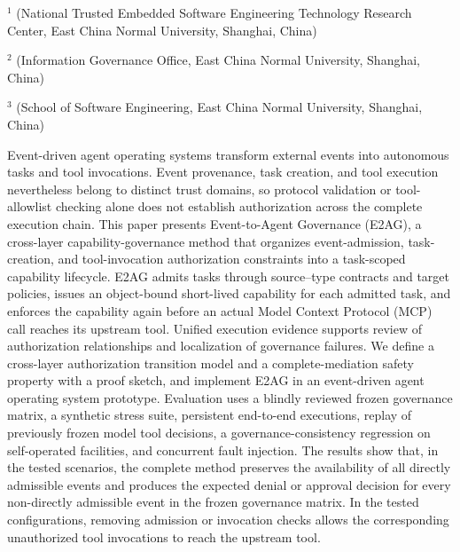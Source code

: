 \vspace{8pt}
\vspace{4pt}
\vspace{3pt}
\begingroup\fontsize{7.5pt}{10pt}\selectfont
\noindent$^{1}$ (National Trusted Embedded Software Engineering Technology Research Center, East China Normal University, Shanghai, China)\par
\noindent$^{2}$ (Information Governance Office, East China Normal University, Shanghai, China)\par
\noindent$^{3}$ (School of Software Engineering, East China Normal University, Shanghai, China)\par
\endgroup

\begin{josenabstract}
Event-driven agent operating systems transform external events into autonomous tasks and tool invocations. Event provenance, task creation, and tool execution nevertheless belong to distinct trust domains, so protocol validation or tool-allowlist checking alone does not establish authorization across the complete execution chain. This paper presents Event-to-Agent Governance (E2AG), a cross-layer capability-governance method that organizes event-admission, task-creation, and tool-invocation authorization constraints into a task-scoped capability lifecycle. E2AG admits tasks through source--type contracts and target policies, issues an object-bound short-lived capability for each admitted task, and enforces the capability again before an actual Model Context Protocol (MCP) call reaches its upstream tool. Unified execution evidence supports review of authorization relationships and localization of governance failures. We define a cross-layer authorization transition model and a complete-mediation safety property with a proof sketch, and implement E2AG in an event-driven agent operating system prototype. Evaluation uses a blindly reviewed frozen governance matrix, a synthetic stress suite, persistent end-to-end executions, replay of previously frozen model tool decisions, a governance-consistency regression on self-operated facilities, and concurrent fault injection. The results show that, in the tested scenarios, the complete method preserves the availability of all directly admissible events and produces the expected denial or approval decision for every non-directly admissible event in the frozen governance matrix. In the tested configurations, removing admission or invocation checks allows the corresponding unauthorized tool invocations to reach the upstream tool.
\end{josenabstract}

\vspace{8pt}
